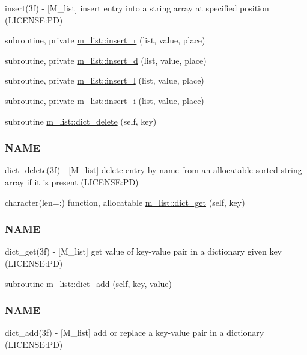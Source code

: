 \begin{DoxyCompactItemize}
\begin{DoxyCompactList}
insert(3f) -\/ \mbox{[}M\+\_\+list\mbox{]} insert entry into a string array at specified position (L\+I\+C\+E\+N\+SE\+:PD) \end{DoxyCompactList}\item 
subroutine, private \mbox{\hyperlink{namespacem__list_affd8a9996750ccf655cf677136d9fc4e}{m\+\_\+list\+::insert\+\_\+r}} (list, value, place)
\item 
subroutine, private \mbox{\hyperlink{namespacem__list_ae2356cb1ec5b313c3fcbad090d6eb440}{m\+\_\+list\+::insert\+\_\+d}} (list, value, place)
\item 
subroutine, private \mbox{\hyperlink{namespacem__list_a6108584670ced9dc4469e76ceb808730}{m\+\_\+list\+::insert\+\_\+l}} (list, value, place)
\item 
subroutine, private \mbox{\hyperlink{namespacem__list_a7d50f88bd8d25138af4e6d484aca2cbc}{m\+\_\+list\+::insert\+\_\+i}} (list, value, place)
\item 
subroutine \mbox{\hyperlink{namespacem__list_aa562d18ce6890a8a1a96d77ff1d39948}{m\+\_\+list\+::dict\+\_\+delete}} (self, key)
\begin{DoxyCompactList}\small\item\em \subsubsection*{N\+A\+ME}

dict\+\_\+delete(3f) -\/ \mbox{[}M\+\_\+list\mbox{]} delete entry by name from an allocatable sorted string array if it is present (L\+I\+C\+E\+N\+SE\+:PD) \end{DoxyCompactList}\item 
character(len=\+:) function, allocatable \mbox{\hyperlink{namespacem__list_a7b9bb0b8fa4b0eeef45d7fcdc21f8bf3}{m\+\_\+list\+::dict\+\_\+get}} (self, key)
\begin{DoxyCompactList}\small\item\em \subsubsection*{N\+A\+ME}

dict\+\_\+get(3f) -\/ \mbox{[}M\+\_\+list\mbox{]} get value of key-\/value pair in a dictionary given key (L\+I\+C\+E\+N\+SE\+:PD) \end{DoxyCompactList}\item 
subroutine \mbox{\hyperlink{namespacem__list_aca66691fd75ea79859a1b4505d2125bb}{m\+\_\+list\+::dict\+\_\+add}} (self, key, value)
\begin{DoxyCompactList}\small\item\em \subsubsection*{N\+A\+ME}

dict\+\_\+add(3f) -\/ \mbox{[}M\+\_\+list\mbox{]} add or replace a key-\/value pair in a dictionary (L\+I\+C\+E\+N\+SE\+:PD) \end{DoxyCompactList}\end{DoxyCompactItemize}

